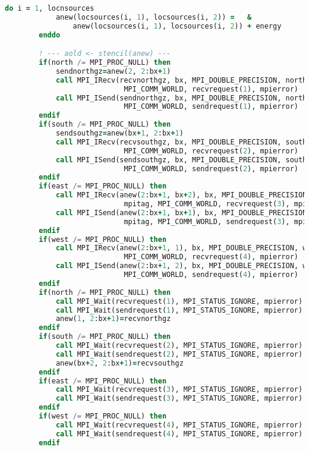 \begin{lstlisting}[language=Fortran, caption={Parallel F2PY implementation of the stencil test case - F90 module code.}]
        do i = 1, locnsources
            anew(locsources(i, 1), locsources(i, 2)) =   &
                anew(locsources(i, 1), locsources(i, 2)) + energy
        enddo

        ! --- aold <- stencil(anew) ---
        if(north /= MPI_PROC_NULL) then 
            sendnorthgz=anew(2, 2:bx+1)
            call MPI_IRecv(recvnorthgz, bx, MPI_DOUBLE_PRECISION, north, mpitag,&
                            MPI_COMM_WORLD, recvrequest(1), mpierror)
            call MPI_ISend(sendnorthgz, bx, MPI_DOUBLE_PRECISION, north, mpitag,&
                            MPI_COMM_WORLD, sendrequest(1), mpierror)
        endif
        if(south /= MPI_PROC_NULL) then 
            sendsouthgz=anew(bx+1, 2:bx+1)
            call MPI_IRecv(recvsouthgz, bx, MPI_DOUBLE_PRECISION, south, mpitag,&
                            MPI_COMM_WORLD, recvrequest(2), mpierror)   
            call MPI_ISend(sendsouthgz, bx, MPI_DOUBLE_PRECISION, south, mpitag,&
                            MPI_COMM_WORLD, sendrequest(2), mpierror)
        endif
        if(east /= MPI_PROC_NULL) then 
            call MPI_IRecv(anew(2:bx+1, bx+2), bx, MPI_DOUBLE_PRECISION, east,&
                            mpitag, MPI_COMM_WORLD, recvrequest(3), mpierror)
            call MPI_ISend(anew(2:bx+1, bx+1), bx, MPI_DOUBLE_PRECISION, east,&
                            mpitag, MPI_COMM_WORLD, sendrequest(3), mpierror)
        endif
        if(west /= MPI_PROC_NULL) then 
            call MPI_IRecv(anew(2:bx+1, 1), bx, MPI_DOUBLE_PRECISION, west, mpitag,  &
                            MPI_COMM_WORLD, recvrequest(4), mpierror)
            call MPI_ISend(anew(2:bx+1, 2), bx, MPI_DOUBLE_PRECISION, west, mpitag,  &
                            MPI_COMM_WORLD, sendrequest(4), mpierror)
        endif
        if(north /= MPI_PROC_NULL) then 
            call MPI_Wait(recvrequest(1), MPI_STATUS_IGNORE, mpierror)
            call MPI_Wait(sendrequest(1), MPI_STATUS_IGNORE, mpierror)
            anew(1, 2:bx+1)=recvnorthgz
        endif
        if(south /= MPI_PROC_NULL) then 
            call MPI_Wait(recvrequest(2), MPI_STATUS_IGNORE, mpierror)
            call MPI_Wait(sendrequest(2), MPI_STATUS_IGNORE, mpierror)
            anew(bx+2, 2:bx+1)=recvsouthgz
        endif
        if(east /= MPI_PROC_NULL) then 
            call MPI_Wait(recvrequest(3), MPI_STATUS_IGNORE, mpierror)
            call MPI_Wait(sendrequest(3), MPI_STATUS_IGNORE, mpierror)
        endif
        if(west /= MPI_PROC_NULL) then 
            call MPI_Wait(recvrequest(4), MPI_STATUS_IGNORE, mpierror)
            call MPI_Wait(sendrequest(4), MPI_STATUS_IGNORE, mpierror)
        endif


\end{lstlisting}
